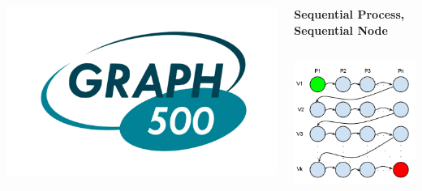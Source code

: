 \documentclass[final]{beamer}
\begin{document}
\begin{frame}[t]
\begin{columns}[t]
\begin{column}{0.60\paperwidth}
\begin{columns}[t,totalwidth=0.60\paperwidth]
\begin{column}{0.28\paperwidth}
\begin{columns}[t,totalwidth=0.28\paperwidth]
\begin{column}{0.12\paperwidth}
								\begin{center} \includegraphics[width=0.12\paperwidth]{img/logo_graph500} \end{center}
							\end{column}
						\end{columns}
					\end{column}
					\begin{column}{0.28\paperwidth}
						\begin{center} \bf{Sequential Process, Sequential Node} \end{center}
						\begin{columns}[t,totalwidth=0.28\paperwidth]
							\begin{column}{0.12\paperwidth}
								\begin{center} \includegraphics[width=0.12\paperwidth]{img/linked_list/seq_proc_seq_node} \end{center}

\end{column}
\end{columns}
\end{column}
\end{columns}
\end{column}
\end{columns}
\end{frame}
\end{document}
